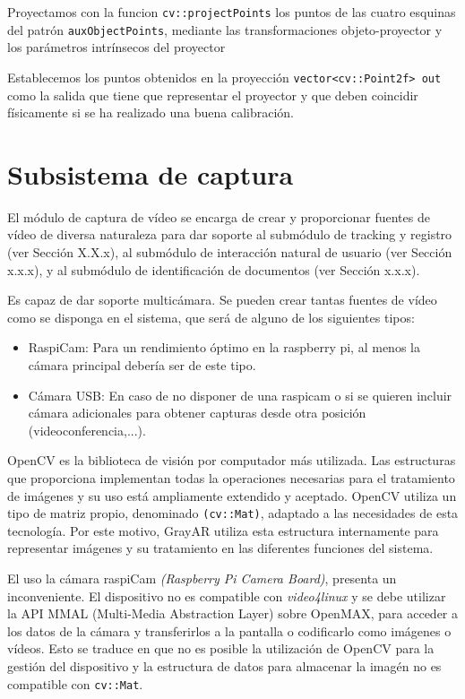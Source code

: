 Proyectamos con la funcion \texttt{cv::projectPoints} los puntos de las cuatro esquinas del patrón \texttt{auxObjectPoints}, mediante las transformaciones objeto-proyector y los parámetros intrínsecos del proyector


Establecemos los puntos obtenidos en la proyección \texttt{vector<cv::Point2f> out} como la salida que tiene que representar el proyector y que deben coincidir físicamente si se ha realizado una buena calibración. %

\section{Subsistema de captura}
El módulo de captura de vídeo se encarga de crear y proporcionar fuentes de vídeo de diversa naturaleza para dar soporte al submódulo de tracking y registro (ver Sección X.X.x), al submódulo de interacción natural de usuario (ver Sección x.x.x), y al submódulo de identificación de documentos (ver Sección x.x.x).

Es capaz de dar soporte multicámara. Se pueden crear tantas fuentes de vídeo como se disponga en el sistema, que será de alguno de los siguientes tipos: 
\begin{itemize}
\item RaspiCam: Para un rendimiento óptimo en la raspberry pi, al menos la cámara principal debería ser de este tipo.
\item Cámara USB: En caso de no disponer de una raspicam o si se quieren incluir cámara adicionales para obtener capturas desde otra posición (videoconferencia,...).
\end{itemize}

OpenCV es la biblioteca de visión por computador más utilizada. Las estructuras que proporciona implementan todas la operaciones necesarias para el tratamiento de imágenes y su uso está ampliamente extendido y aceptado. OpenCV utiliza un tipo de matriz propio, denominado \texttt{(cv::Mat)}, adaptado a las necesidades de esta tecnología. Por este motivo, GrayAR utiliza esta estructura internamente para representar imágenes y su tratamiento en las diferentes funciones del sistema.

El uso la cámara raspiCam \textit{(Raspberry Pi Camera Board)}, presenta un inconveniente. El dispositivo no es compatible con \emph{video4linux} y se debe utilizar la API MMAL (Multi-Media Abstraction Layer) sobre OpenMAX, para acceder a los datos de la cámara y transferirlos a la pantalla o codificarlo como imágenes o vídeos. Esto se traduce en que no es posible la utilización de OpenCV para la gestión del dispositivo y la estructura de datos para almacenar la imagén no es compatible con \texttt{cv::Mat}.  


